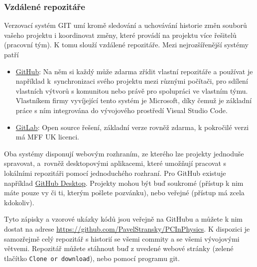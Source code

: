 \documentclass[a4paper,11pt,twoside]{article}
\def\code#1{\textnormal{\texttt{#1}}}
\theoremstyle{red}
\theoremstyle{green}
\begin{document}
\subsubsection{Vzdálené repozitáře}\label{sec:GITRemote}
    Verzovací systém GIT umí kromě sledování a uchovávání historie změn souborů vašeho projektu i koordinovat změny, které provádí na projektu více řešitelů (pracovní tým). 
    K tomu slouží vzdálené repozitáře.
    Mezi nejrozšířenější systémy patří
    \begin{itemize}
    \item \href{https://github.com}{GitHub}: 
        Na něm si každý může zdarma zřídit vlastní repozitáře a používat je například k~synchronizaci svého projektu mezi různými počítači, pro sdílení vlastních výtvorů s komunitou nebo právě pro spolupráci ve vlastním týmu. 
        Vlastníkem firmy vyvíjející tento systém je Microsoft, díky čemuž je základní práce s ním integrována do vývojového prostředí Visual Studio Code.
    \item \href{https://gitlab.mff.cuni.cz}{GitLab}: 
        Open source řešení, základní verze rovněž zdarma, k pokročilé verzi má MFF UK licenci.
    \end{itemize}
    Oba systémy disponují webovým rozhraním, ze kterého lze projekty jednoduše spravovat, a~rovněž desktopovými aplikacemi, které umožňují pracovat s lokálními repozitáři pomocí jednoduchého rozhraní.
    Pro GitHub existuje například \href{https://desktop.github.com}{GitHub Desktop}.
    Projekty mohou být buď soukromé (přístup k nim máte pouze vy či ti, kterým pošlete pozvánku), nebo veřejné (přístup má zcela kdokoliv).

    Tyto zápisky a vzorové ukázky kódů jsou veřejně na GitHubu a můžete k nim dostat na adrese \url{https://github.com/PavelStransky/PCInPhysics}.
    K dispozici je samozřejmě celý repozitář s historií se všemi commity a se všemi vývojovými větvemi.
    Repozitář můžete stáhnout buď z uvedené webové stránky (zelené tlačítko \code{Clone or download}), nebo pomocí programu git.
\end{document}
